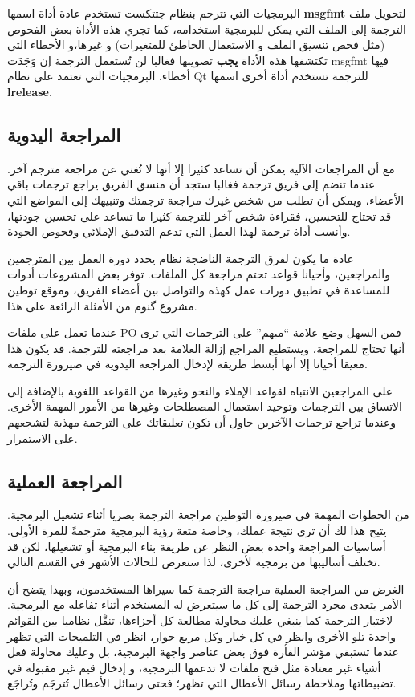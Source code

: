 البرمجيات التي تترجم بنظام جتتكست تستخدم عادة أداة اسمها {\bf msgfmt}
لتحويل ملف الترجمة إلى الملف التي يمكن للبرمجية استخدامه، كما تجري هذه
الأداة بعض الفحوص (مثل فحص تنسيق الملف و الاستعمال الخاطئ للمتغيرات) و
غيرها،و الأخطاء التي تكتشفها هذه الأداة {\bf يجب} تصويبها فغالبا لن
تُستعمل الترجمة إن وَجَدَت msgfmt فيها أخطاء. البرمجيات التي تعتمد على
نظام Qt للترجمة تستخدم أداة أخرى اسمها {\bf lrelease}.

\subsection[ref:37415529]{المراجعة اليدوية}
مع أن المراجعات الآلية يمكن أن
تساعد كثيرا إلا أنها لا تُغني عن مراجعة مترجم آخر. عندما تنضم إلى فريق
ترجمة فغالبا ستجد أن منسق الفريق يراجع ترجمات باقي الأعضاء، ويمكن أن
تطلب من شخص غيرك مراجعة ترجمتك وتنبيهك إلى المواضع التي قد تحتاج
للتحسين، فقراءة شخص آخر للترجمة كثيرا ما تساعد على تحسين جودتها، وأنسب
أداة ترجمة لهذا العمل التي تدعم التدقيق الإملائي وفحوص الجودة.

عادة ما يكون لفرق الترجمة الناضجة نظام يحدد دورة العمل بين المترجمين
والمراجعين، وأحيانا قواعد تحتم مراجعة كل الملفات. توفر بعض المشروعات
أدوات للمساعدة في تطبيق دورات عمل كهذه والتواصل بين أعضاء الفريق، وموقع
توطين مشروع گنوم من الأمثلة الرائعة على هذا.

عندما تعمل على ملفات PO فمن السهل وضع علامة “مبهم” على الترجمات التي ترى
أنها تحتاج للمراجعة، ويستطيع المراجع إزالة العلامة بعد مراجعته للترجمة.
قد يكون هذا معيقا أحيانا إلا أنها أبسط طريقة لإدخال المراجعة اليدوية في
صيرورة الترجمة.

على المراجعين الانتباه لقواعد الإملاء والنحو وغيرها من القواعد اللغوية
بالإضافة إلى الاتساق بين الترجمات وتوحيد استعمال المصطلحات وغيرها من
الأمور المهمة الأخرى. وعندما تراجع ترجمات الآخرين حاول أن تكون تعليقاتك
على الترجمة مهذبة لتشجعهم على الاستمرار.

\subsection[ref:34365426]{المراجعة العملية}
من الخطوات المهمة في صيرورة
التوطين مراجعة الترجمة بصريا أثناء تشغيل البرمجية. يتيح هذا لك أن ترى
نتيجة عملك، وخاصة متعة رؤية البرمجية مترجمةً للمرة الأولى. أساسيات
المراجعة واحدة بغض النظر عن طريقة بناء البرمجية أو تشغيلها، لكن قد
تختلف أساليبها من برمجية لأخرى، لذا سنعرض للحالات الأشهر في القسم
التالي.

الغرض من المراجعة العملية مراجعة الترجمة كما سيراها المستخدمون، وبهذا
يتضح أن الأمر يتعدى مجرد الترجمة إلى كل ما سيتعرض له المستخدم أثناء
تفاعله مع البرمجية. لاختبار الترجمة كما ينبغي عليك محاولة مطالعة كل
أجزاءها، تنقَّل نظاميا بين القوائم واحدة تلو الأخرى وانظر في كل خيار
وكل مربع حوار، انظر في التلميحات التي تظهر عندما تستبقي مؤشر الفأرة فوق
بعض عناصر واجهة البرمجية، بل وعليك محاولة فعل أشياء غير معتادة مثل فتح
ملفات لا تدعمها البرمجية، و إدخال قيم غير مقبولة في تضبيطاتها وملاحظة
رسائل الأعطال التي تظهر؛ فحتى رسائل الأعطال تُترجَم وتُراجَع.

